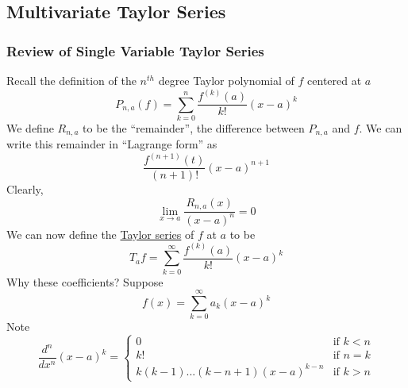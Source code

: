 \documentclass{article}
\begin{document}
\subsection{Multivariate Taylor Series}


\subsubsection{Review of Single Variable Taylor Series}
Recall the definition of the \(n^{th}\) degree Taylor polynomial of \(f\) centered at \(a\)
\begin{equation}P_{n, a}(f) = \sum_{k = 0}^n\frac{f^{(k)}(a)}{k!}(x - a)^k\end{equation}
We define \(R_{n, a}\) to be the ``remainder'', the difference between \(P_{n, a}\) and \(f\). We can write this remainder in ``Lagrange form'' as
\begin{equation}\frac{f^{(n + 1)}(t)}{(n + 1)!}(x - a)^{n + 1}\end{equation}
Clearly,
\begin{equation}\lim_{x \to a}\frac{R_{n, a}(x)}{(x - a)^n} = 0\end{equation}
We can now define the \underline{Taylor series} of \(f\) at \(a\) to be
\begin{equation}T_af = \sum_{k = 0}^\infty\frac{f^{(k)}(a)}{k!}(x - a)^k\end{equation}
Why these coefficients?
Suppose
\begin{equation}f(x) = \sum_{k = 0}^\infty a_k(x - a)^k\end{equation}
Note
\begin{equation}\frac{d^n}{dx^n}(x - a)^k = \left\{\begin{array}{cc}
  0 & \text{if } k < n \\
  k! & \text{if } n = k \\
  k(k - 1)...(k - n + 1)(x - a)^{k - n} & \text{if } k > n
\end{array}\right.\end{equation}
\end{document}
